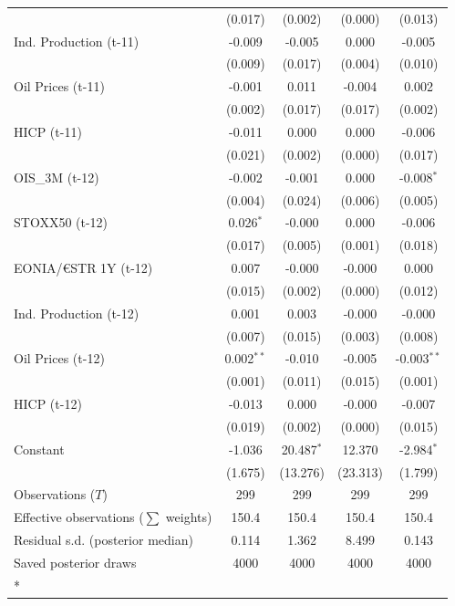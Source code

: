 \begin{longtable}[t]{lcccc}
 & (0.017) & (0.002) & (0.000) & (0.013)\\
Ind. Production (t-11) & -0.009 & -0.005 & 0.000 & -0.005\\
 & (0.009) & (0.017) & (0.004) & (0.010)\\
Oil Prices (t-11) & -0.001 & 0.011 & -0.004 & 0.002\\
 & (0.002) & (0.017) & (0.017) & (0.002)\\
HICP (t-11) & -0.011 & 0.000 & 0.000 & -0.006\\
 & (0.021) & (0.002) & (0.000) & (0.017)\\
OIS\_3M (t-12) & -0.002 & -0.001 & 0.000 & -0.008$^{*}$\\
 & (0.004) & (0.024) & (0.006) & (0.005)\\
STOXX50 (t-12) & 0.026$^{*}$ & -0.000 & 0.000 & -0.006\\
 & (0.017) & (0.005) & (0.001) & (0.018)\\
EONIA/€STR 1Y (t-12) & 0.007 & -0.000 & -0.000 & 0.000\\
 & (0.015) & (0.002) & (0.000) & (0.012)\\
Ind. Production (t-12) & 0.001 & 0.003 & -0.000 & -0.000\\
 & (0.007) & (0.015) & (0.003) & (0.008)\\
Oil Prices (t-12) & 0.002$^{**}$ & -0.010 & -0.005 & -0.003$^{**}$\\
 & (0.001) & (0.011) & (0.015) & (0.001)\\
HICP (t-12) & -0.013 & 0.000 & -0.000 & -0.007\\
 & (0.019) & (0.002) & (0.000) & (0.015)\\
Constant & -1.036 & 20.487$^{*}$ & 12.370 & -2.984$^{*}$\\
 & (1.675) & (13.276) & (23.313) & (1.799)\\
\midrule
Observations ($T$) & 299 & 299 & 299 & 299\\
Effective observations ($\sum$ weights) & 150.4 & 150.4 & 150.4 & 150.4\\
Residual s.d. (posterior median) & 0.114 & 1.362 & 8.499 & 0.143\\
Saved posterior draws & 4000 & 4000 & 4000 & 4000\\*
\end{longtable}
\endgroup{}

\begingroup\fontsize{7}{9}\selectfont


